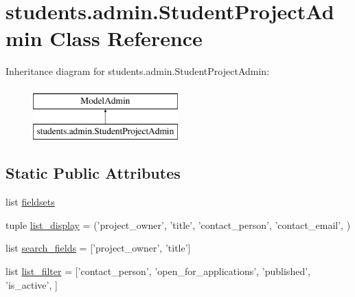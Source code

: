 \hypertarget{classstudents_1_1admin_1_1_student_project_admin}{\section{students.\-admin.\-Student\-Project\-Admin Class Reference}
\label{classstudents_1_1admin_1_1_student_project_admin}
}
Inheritance diagram for students.\-admin.\-Student\-Project\-Admin\-:\begin{figure}[H]
\begin{center}
\leavevmode
\includegraphics[height=2.000000cm]{classstudents_1_1admin_1_1_student_project_admin}
\end{center}
\end{figure}
\subsection*{Static Public Attributes}
\begin{DoxyCompactItemize}
\item 
list \hyperlink{classstudents_1_1admin_1_1_student_project_admin_ac705b970c858c3a69887299a50844624}{fieldsets}
\item 
tuple \hyperlink{classstudents_1_1admin_1_1_student_project_admin_af38f3f1204fad4b8bdc1b4a7a3e71749}{list\-\_\-display} = ('project\-\_\-owner', 'title', 'contact\-\_\-person', 'contact\-\_\-email', )
\item 
list \hyperlink{classstudents_1_1admin_1_1_student_project_admin_a48716676acc1e54867f4085bec1ae7e7}{search\-\_\-fields} = \mbox{[}'project\-\_\-owner', 'title'\mbox{]}
\item 
list \hyperlink{classstudents_1_1admin_1_1_student_project_admin_a2f15ee6b454237926ee185d9e84afce6}{list\-\_\-filter} = \mbox{[}'contact\-\_\-person', 'open\-\_\-for\-\_\-applications', 'published', 'is\-\_\-active', \mbox{]}
\end{DoxyCompactItemize}


